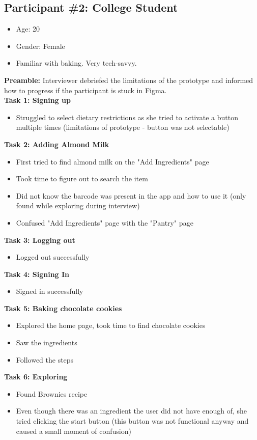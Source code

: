 \documentclass[manuscript, screen, nonacm]{acmart}
\begin{document}
\subsection{Participant \#2: College Student}
\begin{itemize}
    \item Age: 20
    \item Gender: Female
    \item Familiar with baking. Very tech-savvy.
\end{itemize}
\textbf{Preamble:} Interviewer debriefed the limitations of the prototype and informed how to progress if the participant is stuck in Figma.\\
\textbf{Task 1: Signing up}
\begin{itemize}
    \item Struggled to select dietary restrictions as she tried to activate a button multiple times (limitations of prototype - button was not selectable)
\end{itemize}
\textbf{Task 2: Adding Almond Milk}
\begin{itemize}
    \item First tried to find almond milk on the "Add Ingredients" page
    \item Took time to figure out to search the item
    \item Did not know the barcode was present in the app and how to use it (only found while exploring during interview)
    \item Confused "Add Ingredients" page with the "Pantry" page
\end{itemize}
\textbf{Task 3: Logging out}
\begin{itemize}
    \item Logged out successfully
\end{itemize}
\textbf{Task 4: Signing In}
\begin{itemize}
    \item Signed in successfully
\end{itemize}
\textbf{Task 5: Baking chocolate cookies}
\begin{itemize}
    \item Explored the home page, took time to find chocolate cookies
    \item Saw the ingredients
    \item Followed the steps
\end{itemize}
\textbf{Task 6: Exploring}
\begin{itemize}
    \item Found Brownies recipe
    \item Even though there was an ingredient the user did not have enough of, she tried clicking the start button (this button was not functional anyway and caused a small moment of confusion)
\end{itemize}
\end{document}
